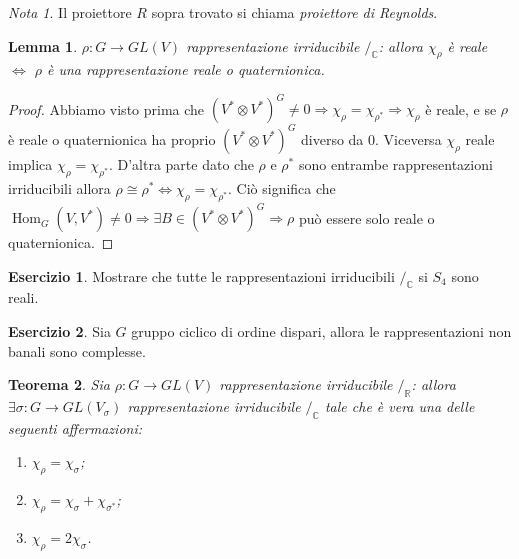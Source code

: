 \documentclass[11pt]{article}
\theoremstyle{plain}
\newtheorem{thm}{Teorema}[section]
\newtheorem{lemma}[thm]{Lemma}
\theoremstyle{definition}
\newtheorem{exercise}{Esercizio}[section]
\theoremstyle{remark}
\newtheorem*{note}{Nota}
\newcommand{\C}{\mathbb{C}}
\newcommand{\R}{\mathbb{R}}
\DeclareMathOperator{\Hom}{Hom}
\begin{document}
\begin{note}
Il proiettore $R$ sopra trovato si chiama \emph{proiettore di Reynolds}.
\end{note}


\begin{lemma} $\rho:G\rightarrow GL(V)$ rappresentazione irriducibile $/_\C$: allora $\chi_\rho$ è reale $\Leftrightarrow$ $\rho$ è una rappresentazione reale o quaternionica.
\end{lemma}
\begin{proof} Abbiamo visto prima che $(V^*\otimes V^*)^G\neq 0\Rightarrow \chi_\rho=\chi_{\rho^*}\Rightarrow \chi_\rho$ è reale, e se $\rho$ è reale o quaternionica ha proprio $(V^*\otimes V^*)^G$ diverso da $0$. Viceversa $\chi_\rho$ reale implica $\chi_\rho=\chi_{\rho^*}$. D'altra parte dato che $\rho$ e $\rho^*$ sono entrambe rappresentazioni irriducibili allora $\rho\cong\rho^*\Leftrightarrow \chi_\rho =\chi_{\rho^*}$. Ciò significa che $\Hom_G(V,V^*)\neq 0\Rightarrow \exists B\in (V^*\otimes V^*)^G\Rightarrow \rho$ può essere solo reale o quaternionica.
\end{proof}


\begin{exercise}
	Mostrare che tutte le rappresentazioni irriducibili $/_\C$ si $S_4$ sono reali.
\end{exercise}
\begin{exercise}
	Sia $G$ gruppo ciclico di ordine dispari, allora le rappresentazioni non banali sono complesse.
\end{exercise}




\begin{thm}
Sia $\rho:G\rightarrow GL(V)$ rappresentazione irriducibile $/_\R$: allora $\exists \sigma:G\rightarrow GL(V_{\sigma})$ rappresentazione irriducibile $/_\C$ tale che è vera una delle seguenti affermazioni:
\begin{enumerate}
\item $\chi_\rho=\chi_\sigma$;
\item $\chi_\rho=\chi_\sigma+\chi_{\sigma^*}$;
\item $\chi_\rho= 2\chi_\sigma$.
\end{enumerate}
\end{thm}
\end{document}

